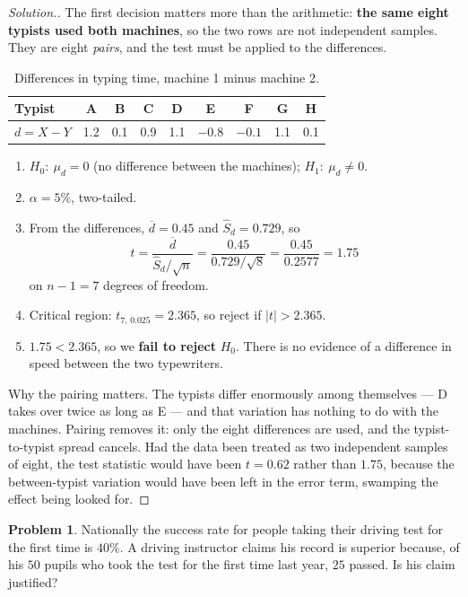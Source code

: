 \documentclass[11pt,a4paper]{article}
\theoremstyle{definition}
\newtheorem{problemx}{Problem}[section]
\newenvironment{problem}{\begin{problemx}}{\end{problemx}}
\newenvironment{solution}
  {\renewcommand{\qedsymbol}{}\begin{proof}[\textit{Solution}.]}
  {\end{proof}}
\begin{document}
\begin{solution}
The first decision matters more than the arithmetic: \textbf{the same eight typists used
both machines}, so the two rows are not independent samples. They are eight \emph{pairs}, and
the test must be applied to the differences.
\begin{table}[H]
\centering
\begin{tabular}{l|cccccccc}
Typist & A & B & C & D & E & F & G & H\\
\hline
$d=X-Y$ & 1.2 & 0.1 & 0.9 & 1.1 & $-0.8$ & $-0.1$ & 1.1 & 0.1\\
\end{tabular}
\caption{Differences in typing time, machine 1 minus machine 2.}
\end{table}

\begin{enumerate}
\item $H_0:\ \mu_d=0$ (no difference between the machines); $H_1:\ \mu_d\neq 0$.
\item $\alpha=5\%$, two-tailed.
\item From the differences, $\overline{d}=0.45$ and $\widehat{S}_d=0.729$, so
\[t=\frac{\overline{d}}{\widehat{S}_d/\sqrt{n}}=\frac{0.45}{0.729/\sqrt{8}}=\frac{0.45}{0.2577}=1.75\]
on $n-1=7$ degrees of freedom.
\item Critical region: $t_{7,\,0.025}=2.365$, so reject if $|t|>2.365$.
\item $1.75<2.365$, so we \textbf{fail to reject} $H_0$. There is no evidence of a
difference in speed between the two typewriters.
\end{enumerate}

Why the pairing matters. The typists differ enormously among themselves --- D takes over
twice as long as E --- and that variation has nothing to do with the machines. Pairing
removes it: only the eight differences are used, and the typist-to-typist spread cancels.
Had the data been treated as two independent samples of eight, the test statistic would have
been $t=0.62$ rather than $1.75$, because the between-typist variation would have been left
in the error term, swamping the effect being looked for.
\end{solution}

\begin{problem}
Nationally the success rate for people taking their driving test for the first time is
$40\%$. A driving instructor claims his record is superior because, of his $50$ pupils who
took the test for the first time last year, $25$ passed. Is his claim justified?
\end{problem}
\end{document}
